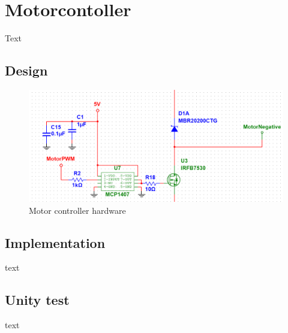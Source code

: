 \section{Motorcontoller}
Text

\subsection{Design}

\begin{figure}[H]
	\centering
	\includegraphics[width=0.7\linewidth]{Hardware/Pictures/Motorstyring}
	\caption{Motor controller hardware}
	\label{fig:Motorcontroller}
\end{figure}

\subsection{Implementation}
text

\subsection{Unity test}
text